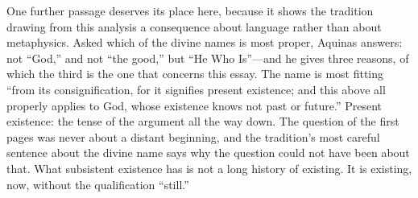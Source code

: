 One further passage deserves its place here, because it shows the tradition drawing from this analysis a consequence about language rather than about metaphysics. Asked which of the divine names is most proper, Aquinas answers: not ``God,'' and not ``the good,'' but ``He Who Is''---and he gives three reasons, of which the third is the one that concerns this essay. The name is most fitting ``from its consignification, for it signifies present existence; and this above all properly applies to God, whose existence knows not past or future.'' Present existence: the tense of the argument all the way down. The question of the first pages was never about a distant beginning, and the tradition's most careful sentence about the divine name says why the question could not have been about that. What subsistent existence has is not a long history of existing. It is existing, now, without the qualification ``still.''
